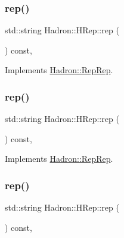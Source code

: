 \subsubsection{\texorpdfstring{rep()}{rep()}\hspace{0.1cm}{\footnotesize\ttfamily [1/5]}}
{\footnotesize\ttfamily std\+::string Hadron\+::\+H\+Rep\+::rep (\begin{DoxyParamCaption}{ }\end{DoxyParamCaption}) const\hspace{0.3cm}{\ttfamily [inline]}, {\ttfamily [virtual]}}



Implements \mbox{\hyperlink{structHadron_1_1RepRep_ab3213025f6de249f7095892109575fde}{Hadron\+::\+Rep\+Rep}}.

\mbox{\label{structHadron_1_1HRep_aa90a43bdbf19213e75180e0457ae36d0}} 
\subsubsection{\texorpdfstring{rep()}{rep()}\hspace{0.1cm}{\footnotesize\ttfamily [2/5]}}
{\footnotesize\ttfamily std\+::string Hadron\+::\+H\+Rep\+::rep (\begin{DoxyParamCaption}{ }\end{DoxyParamCaption}) const\hspace{0.3cm}{\ttfamily [inline]}, {\ttfamily [virtual]}}



Implements \mbox{\hyperlink{structHadron_1_1RepRep_ab3213025f6de249f7095892109575fde}{Hadron\+::\+Rep\+Rep}}.

\mbox{\label{structHadron_1_1HRep_aa90a43bdbf19213e75180e0457ae36d0}} 
\subsubsection{\texorpdfstring{rep()}{rep()}\hspace{0.1cm}{\footnotesize\ttfamily [3/5]}}
{\footnotesize\ttfamily std\+::string Hadron\+::\+H\+Rep\+::rep (\begin{DoxyParamCaption}{ }\end{DoxyParamCaption}) const\hspace{0.3cm}{\ttfamily [inline]}, {\ttfamily [virtual]}}



